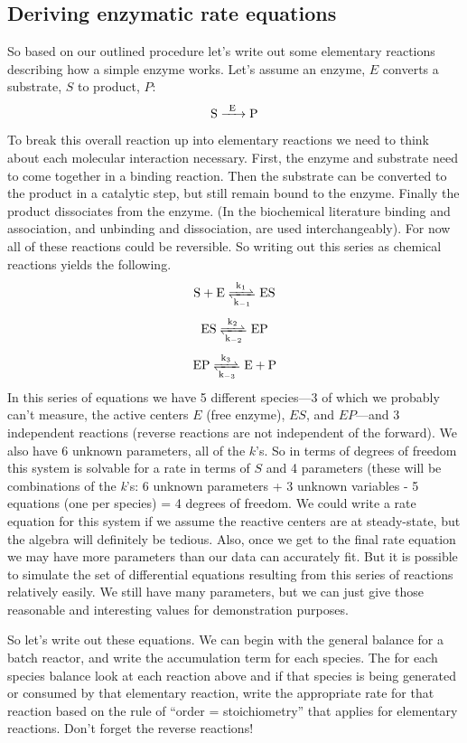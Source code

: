 \documentclass[
]{article}
\begin{document}
\hypertarget{deriving-enzymatic-rate-equations}{%
\subsection{Deriving enzymatic rate equations}\label{deriving-enzymatic-rate-equations}}

So based on our outlined procedure let's write out some elementary reactions describing how a simple enzyme works. Let's assume an enzyme, \(E\) converts a substrate, \(S\) to product, \(P\):
\[\ce{S ->[E] P}\]
To break this overall reaction up into elementary reactions we need to think about each molecular interaction necessary. First, the enzyme and substrate need to come together in a binding reaction. Then the substrate can be converted to the product in a catalytic step, but still remain bound to the enzyme. Finally the product dissociates from the enzyme. (In the biochemical literature binding and association, and unbinding and dissociation, are used interchangeably). For now all of these reactions could be reversible. So writing out this series as chemical reactions yields the following.
\[\ce{S + E <=>[k_1][k_{-1}] ES}\]
\[\ce{ES <=>[k_2][k_{-2}] EP}\]
\[\ce{EP <=>[k_3][k_{-3}] E + P}\]
In this series of equations we have 5 different species---3 of which we probably can't measure, the active centers \(E\) (free enzyme), \(ES\), and \(EP\)---and 3 independent reactions (reverse reactions are not independent of the forward). We also have 6 unknown parameters, all of the \(k\)'s. So in terms of degrees of freedom this system is solvable for a rate in terms of \(S\) and 4 parameters (these will be combinations of the \emph{k}'s: 6 unknown parameters + 3 unknown variables - 5 equations (one per species) = 4 degrees of freedom. We could write a rate equation for this system if we assume the reactive centers are at steady-state, but the algebra will definitely be tedious. Also, once we get to the final rate equation we may have more parameters than our data can accurately fit. But it is possible to simulate the set of differential equations resulting from this series of reactions relatively easily. We still have many parameters, but we can just give those reasonable and interesting values for demonstration purposes.

So let's write out these equations. We can begin with the general balance for a batch reactor, and write the accumulation term for each species. The for each species balance look at each reaction above and if that species is being generated or consumed by that elementary reaction, write the appropriate rate for that reaction based on the rule of ``order = stoichiometry'' that applies for elementary reactions. Don't forget the reverse reactions!
\end{document}
